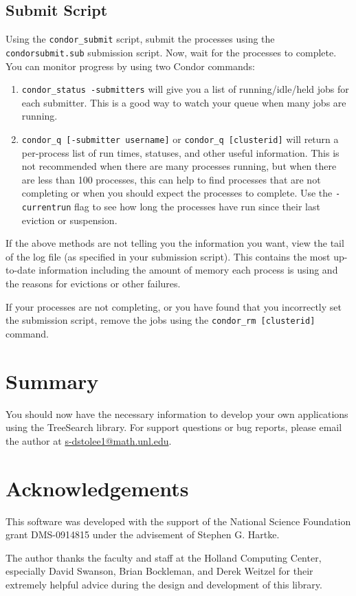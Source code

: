 \documentclass[11pt]{article}
\begin{document}
\subsection{Submit Script}

Using the \texttt{condor\_submit} script, submit the processes
	using the \texttt{condorsubmit.sub} submission script.
Now, wait for the processes to complete.
You can monitor progress by using two Condor commands:
	\begin{enumerate}
		\item \texttt{condor\_status -submitters} will give you a list 
					of running/idle/held jobs for each submitter. 
					This is a good way to watch your queue when many jobs are running.
		\item \texttt{condor\_q [-submitter username]} or \texttt{condor\_q [clusterid]}
				will return a per-process list of run times, statuses, 
				and other useful information.
				This is not recommended when there are many processes running, 
					but when there are less than 100 processes,
					this can help to find processes that are not completing
					or when you should expect the processes to complete.
				Use the \texttt{-currentrun} flag to 
					see how long the processes have run since their
					last eviction or suspension.
	\end{enumerate}	

If the above methods are not telling you the information you want,
	view the tail of the log file (as specified in your submission script).
This contains the most up-to-date information including
	the amount of memory each process is using
	and the reasons for evictions or other failures.
	
If your processes are not completing, or you have found that
	you incorrectly set the submission script, 
	remove the jobs using the \texttt{condor\_rm [clusterid]} command.

\section{Summary}
\label{sec:Summary}

You should now have the necessary information to develop your own applications
	using the TreeSearch library.
For support questions or bug reports, please email 	the author at 
	\href{mailto:s-dstolee1@math.unl.edu}{s-dstolee1@math.unl.edu}.

\section{Acknowledgements}

This software was developed with the support of the National Science Foundation grant DMS-0914815
	under the advisement of Stephen G. Hartke.

The author thanks the faculty and staff
	at the Holland Computing Center,
	especially David Swanson, Brian Bockleman, and Derek Weitzel for their extremely helpful advice
	during the design and development of this library.






\end{document}
